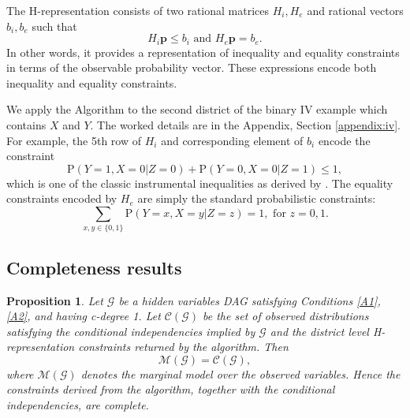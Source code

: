 \documentclass[12pt]{article}
\newtheorem{proposition}{Proposition}
\newtheorem{definition}{Definition}
\def\Pr{{\mathrm{P}}}
\begin{document}
The H-representation consists of two rational matrices $H_i, H_e$ and rational vectors $b_i, b_e$ such that 
\[
H_i \boldsymbol{p} \leq b_i
\mbox{ and }
H_e \boldsymbol{p} = b_e. 
\]
In other words, it provides a representation of inequality and equality constraints in terms of the observable probability vector. 
These expressions encode both inequality and equality constraints. 

We apply the Algorithm to the second district of the binary IV example which contains $X$ and $Y$. The worked details are in the Appendix, Section \ref{appendix:iv}. For example, the 5th row of $H_i$ and corresponding element of $b_i$ encode the constraint
\[
\Pr(Y = 1, X = 0 | Z = 0) + \Pr(Y = 0, X = 0 | Z = 1) \leq 1,
\]
which is one of the classic instrumental inequalities as derived by \citet{pearl1995testability}. The equality constraints encoded by $H_e$ are simply the standard probabilistic constraints: 
\begin{equation}
\sum_{x, y \in \{0, 1\}} \Pr(Y = x, X = y | Z = z) = 1, \mbox{ for } z = 0, 1. \label{eqn:ivex}    
\end{equation}


\subsection{Completeness results} \label{sec:complete}





\begin{proposition} \label{prop:complete}
 Let $\mathcal{G}$ be a hidden variables DAG satisfying Conditions \ref{A1}, \ref{A2}, and having c-degree 1. Let $\mathcal{C}(\mathcal{G})$ be the set of observed distributions satisfying the conditional independencies implied by $\mathcal{G}$ and the district level H-representation constraints returned by the algorithm. Then
\[
    \mathcal{M}(\mathcal{G}) = \mathcal{C}(\mathcal{G}),
\]
where $\mathcal{M}(\mathcal{G})$ denotes the marginal model over the observed variables. Hence the constraints derived from the algorithm, together with the conditional independencies, are complete.
\end{proposition}
\end{document}
